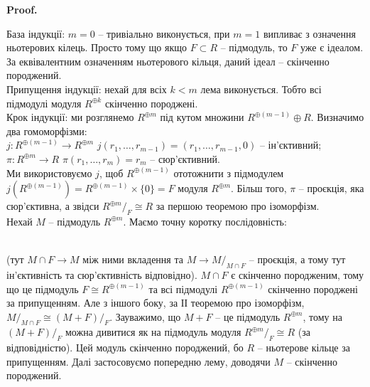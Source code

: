 \documentclass[a4paper, 10pt]{article}
\makeatletter
\theoremstyle{theoremdd}
\theoremstyle{theoremdd}
\theoremstyle{theoremdd}
\theoremstyle{theoremdd}
\theoremstyle{theoremdd}
\theoremstyle{theoremdd}
\theoremstyle{theoremdd}
\theoremstyle{theoremdd}
\theoremstyle{theoremdd}
\theoremstyle{theoremdd}
\theoremstyle{theoremdd}
\theoremstyle{theoremdd}
\theoremstyle{theoremdd}
\theoremstyle{theoremdd}
\theoremstyle{theoremdd}
\renewenvironment{proof}[1][Proof.\\]{\par
\pushQED{\hfill \qed}%
\normalfont \topsep6\p@\@plus6\p@\relax
\trivlist
\item\relax
{\bfseries
#1\@addpunct{.}}\hspace\labelsep\ignorespaces
}{%
\popQED\endtrivlist\@endpefalse
}
\makeatother
\begin{document}
\begin{proof}
База індукції: $m = 0$ -- тривіально виконується, при $m =1$ випливає з означення ньотерових кілець. Просто тому що якщо $F \subset R$ -- підмодуль, то $F$ уже є ідеалом. За еквівалентним означенням ньотерового кільця, даний ідеал -- скінченно породжений.\\
Припущення індукції: нехай для всіх $k < m$ лема виконується. Тобто всі підмодулі модуля $R^{\oplus k}$ скінченно породжені.\\
Крок індукції: ми розглянемо $R^{\oplus m}$ під кутом множини $R^{\oplus (m-1)} \oplus R$. Визначимо два гомоморфізми:\\
$j \colon R^{\oplus (m-1)} \to R^{\oplus m}$ \qquad $j(r_1,\dots,r_{m-1}) = (r_1,\dots,r_{m-1},0)$ -- ін'єктивний;\\
$\pi \colon R^{\oplus m} \to R$ \qquad\qquad $\pi(r_1,\dots,r_m) = r_m$ -- сюр'єктивний.\\
Ми використовуємо $j$, щоб $R^{\oplus (m-1)}$ ототожнити з підмодулем $j(R^{\oplus (m-1)}) = R^{\oplus (m-1)} \times \{0\} = F$ модуля $R^{\oplus m}$. Більш того, $\pi$ -- проєкція, яка сюр'єктивна, а звідси $R^{\oplus m}/_F \cong R$ за першою теоремою про ізоморфізм.\\
Нехай $M$ -- підмодуль $R^{\oplus m}$. Маємо точну коротку послідовність:\\
\\
(тут $M \cap F \to M$ між ними вкладення та $M \to M/_{M \cap F}$ -- проєкція, а тому тут ін'єктивність та сюр'єктивність відповідно). $M \cap F$ є скінченно породженим, тому що це підмодуль $F \cong R^{\oplus (m-1)}$ та всі підмодулі $R^{\oplus (m-1)}$ скінченно породжені за припущенням. Але з іншого боку, за ІІ теоремою про ізоморфізм, $M/_{M \cap F} \cong (M+F)/_F$. Зауважимо, що $M+F$ -- це підмодуль $R^{\oplus m}$, тому на $(M+F)/_F$ можна дивитися як на підмодуль модуля $R^{\oplus m}/_F \cong R$ (за відповідністю). Цей модуль скінченно породжений, бо $R$ -- ньотерове кільце за припущенням. Далі застосовуємо попередню лему, доводячи $M$ -- скінченно породжений.
\end{proof}
\end{document}
